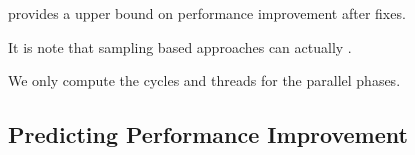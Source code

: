 \cheetah{} provides a upper bound on performance improvement after fixes. 

It is note that sampling based approaches can actually 
.

We only compute the cycles and threads for the parallel phases. 

\subsection{Predicting Performance Improvement}

















